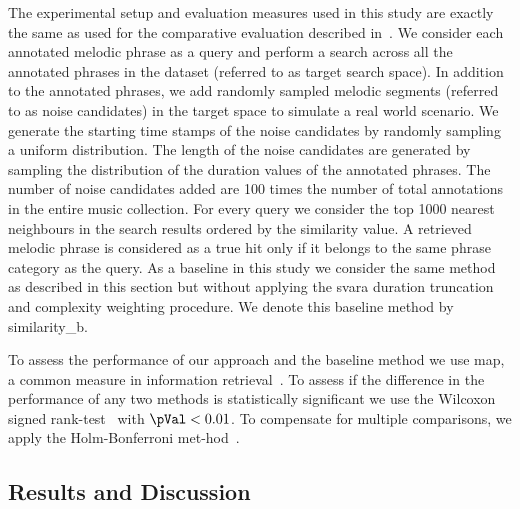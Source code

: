 The experimental setup and evaluation measures used in this study are exactly the same as used for the comparative evaluation described in~. We consider each annotated melodic phrase as a query and perform a search across all the annotated phrases in the dataset (referred to as target search space). In addition to the annotated phrases, we add randomly sampled melodic segments (referred to as noise candidates) in the target space to simulate a real world scenario. We generate the starting time stamps of the noise candidates by randomly sampling a uniform distribution. The length of the noise candidates are generated by sampling the distribution of the duration values of the annotated phrases. The number of noise candidates added are 100 times the number of total annotations in the entire music collection. For every query we consider the top 1000 nearest neighbours in the search results ordered by the similarity value. A retrieved melodic phrase is considered as a true hit only if it belongs to the same phrase category as the query. As a baseline in this study we consider the same method as described in this section but without applying the \gls{svara} duration truncation and complexity weighting procedure. We denote this baseline method by \acrshort{similarity_b}.

To assess the performance of our approach and the baseline method we use \acrfull{map}, a common measure in information retrieval~\citep{manning2008introduction}. To assess if the difference in the performance of any two methods is statistically significant we use the Wilcoxon signed rank-test~\citep{wilcoxon1945individual} with $\pVal < 0.01$. To compensate for multiple comparisons, we apply the Holm-Bonferroni met-hod~\citep{holm1979simple}.


\subsection{Results and Discussion}
\label{sec:patterns_improving_similarity_results_and_discussion}


